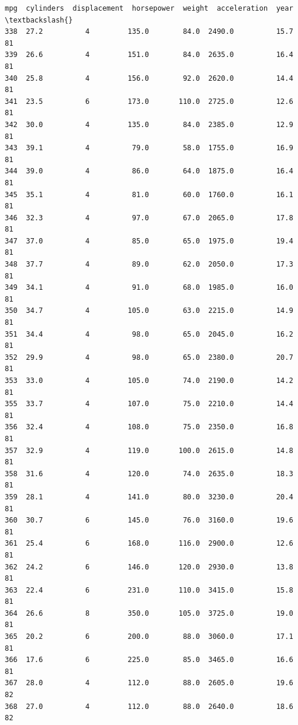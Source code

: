 \documentclass[11pt]{article}
\makeatletter
\newcommand{\boxspacing}{\kern\kvtcb@left@rule\kern\kvtcb@boxsep}
\newcommand{\prompt}[4]{
        {\ttfamily\llap{{\color{#2}[#3]:\hspace{3pt}#4}}\vspace{-\baselineskip}}
    }
\makeatother
\begin{document}
            \begin{tcolorbox}[breakable, size=fbox, boxrule=.5pt, pad at break*=1mm, opacityfill=0]
\prompt{Out}{outcolor}{83}{\boxspacing}
\begin{Verbatim}[commandchars=\\\{\}]
      mpg  cylinders  displacement  horsepower  weight  acceleration  year  \textbackslash{}
338  27.2          4         135.0        84.0  2490.0          15.7    81
339  26.6          4         151.0        84.0  2635.0          16.4    81
340  25.8          4         156.0        92.0  2620.0          14.4    81
341  23.5          6         173.0       110.0  2725.0          12.6    81
342  30.0          4         135.0        84.0  2385.0          12.9    81
343  39.1          4          79.0        58.0  1755.0          16.9    81
344  39.0          4          86.0        64.0  1875.0          16.4    81
345  35.1          4          81.0        60.0  1760.0          16.1    81
346  32.3          4          97.0        67.0  2065.0          17.8    81
347  37.0          4          85.0        65.0  1975.0          19.4    81
348  37.7          4          89.0        62.0  2050.0          17.3    81
349  34.1          4          91.0        68.0  1985.0          16.0    81
350  34.7          4         105.0        63.0  2215.0          14.9    81
351  34.4          4          98.0        65.0  2045.0          16.2    81
352  29.9          4          98.0        65.0  2380.0          20.7    81
353  33.0          4         105.0        74.0  2190.0          14.2    81
355  33.7          4         107.0        75.0  2210.0          14.4    81
356  32.4          4         108.0        75.0  2350.0          16.8    81
357  32.9          4         119.0       100.0  2615.0          14.8    81
358  31.6          4         120.0        74.0  2635.0          18.3    81
359  28.1          4         141.0        80.0  3230.0          20.4    81
360  30.7          6         145.0        76.0  3160.0          19.6    81
361  25.4          6         168.0       116.0  2900.0          12.6    81
362  24.2          6         146.0       120.0  2930.0          13.8    81
363  22.4          6         231.0       110.0  3415.0          15.8    81
364  26.6          8         350.0       105.0  3725.0          19.0    81
365  20.2          6         200.0        88.0  3060.0          17.1    81
366  17.6          6         225.0        85.0  3465.0          16.6    81
367  28.0          4         112.0        88.0  2605.0          19.6    82
368  27.0          4         112.0        88.0  2640.0          18.6    82

\end{Verbatim}
\end{tcolorbox}
\end{document}
